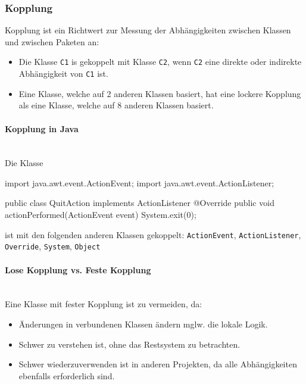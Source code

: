 \documentclass[ngerman]{tuda_summary}
\begin{document}
\subsubsection{Kopplung}
Kopplung ist ein Richtwert zur Messung der Abhängigkeiten zwischen Klassen und zwischen Paketen an:
\begin{itemize}
    \item Die Klasse \texttt{C1} is gekoppelt mit Klasse \texttt{C2}, wenn \texttt{C2} eine direkte oder indirekte Abhängigkeit von \texttt{C1} ist.
    \item Eine Klasse, welche auf 2 anderen Klassen basiert, hat eine lockere Kopplung als eine Klasse, welche auf 8 anderen Klassen basiert.
\end{itemize}

\paragraph{Kopplung in Java}\mbox{}\\
Die Klasse
\begin{codeBlock}[autogobble]{}
    import java.awt.event.ActionEvent;
    import java.awt.event.ActionListener;

    public class QuitAction implements ActionListener {
    	@Override
    	public void actionPerformed(ActionEvent event) {
    		System.exit(0);
    	}
    }
\end{codeBlock}
ist mit den folgenden anderen Klassen gekoppelt: \texttt{ActionEvent}, \texttt{ActionListener}, \texttt{Override}, \texttt{System}, \texttt{Object}

\paragraph{Lose Kopplung vs. Feste Kopplung}\mbox{}\\
Eine Klasse mit fester Kopplung ist zu vermeiden, da:
\begin{itemize}
    \item Änderungen in verbundenen Klassen ändern mglw. die lokale Logik.
    \item Schwer zu verstehen ist, ohne das Restsystem zu betrachten.
    \item Schwer wiederzuverwenden ist in anderen Projekten, da alle Abhängigkeiten ebenfalls erforderlich sind.
\end{itemize}
\end{document}
